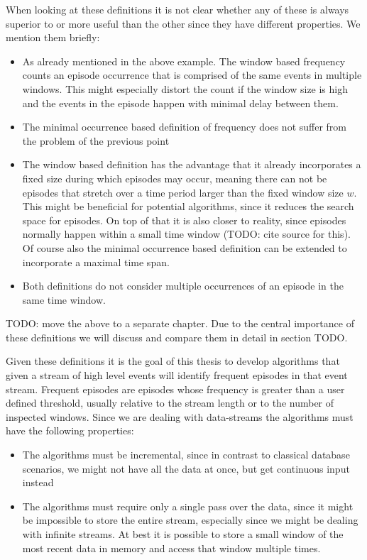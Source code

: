 \documentclass[journal]{IEEEtran}
\begin{document}
When looking at these definitions it is not clear whether any of these is always superior to or more useful than the other since they have different properties. We mention them briefly:

\begin{itemize}
	\item As already mentioned in the above example. The window based frequency counts an episode occurrence that is comprised of the same events in multiple windows. This might especially distort the count if the window size is high and the events in the episode happen with minimal delay between them.
	\item The minimal occurrence based definition of frequency does not suffer from the problem of the previous point
	\item The window based definition has the advantage that it already incorporates a fixed size during which episodes may occur, meaning there can not be episodes that stretch over a time period larger than the fixed window size $w$. This might be beneficial for potential algorithms, since it reduces the search space for episodes. On top of that it is also closer to reality, since episodes normally happen within a small time window (TODO: cite source for this). Of course also the minimal occurrence based definition can be extended to incorporate a maximal time span.
	\item Both definitions do not consider multiple occurrences of an episode in the same time window.
\end{itemize}

TODO: move the above to a separate chapter. Due to the central importance of these definitions we will discuss and compare them in detail in section TODO. \newline \newline


Given these definitions it is the goal of this thesis to develop algorithms that given a stream of high level events will identify frequent episodes in that event stream. Frequent episodes are episodes whose frequency is greater than a user defined threshold, usually relative to the stream length or to the number of inspected windows. Since we are dealing with data-streams the algorithms must have the following properties:

\begin{itemize}
	\item The algorithms must be incremental, since in contrast to classical database scenarios, we might not have all the data at once, but get continuous input instead
	\item The algorithms must require only a single pass over the data, since it might be impossible to store the entire stream, especially since we might be dealing with infinite streams. At best it is possible to store a small window of the most recent data in memory and access that window multiple times.
\end{itemize}
\end{document}
